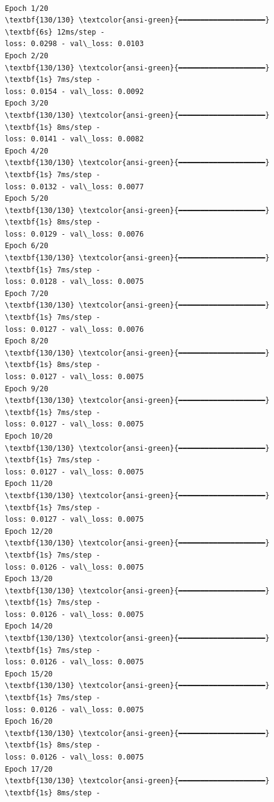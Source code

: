\documentclass[11pt]{article}
\begin{document}
    \begin{center}
    \end{center}
    { \hspace*{\fill} \\}
    
    \begin{Verbatim}[commandchars=\\\{\}]
Epoch 1/20
\textbf{130/130} \textcolor{ansi-green}{━━━━━━━━━━━━━━━━━━━━} \textbf{6s} 12ms/step -
loss: 0.0298 - val\_loss: 0.0103
Epoch 2/20
\textbf{130/130} \textcolor{ansi-green}{━━━━━━━━━━━━━━━━━━━━} \textbf{1s} 7ms/step -
loss: 0.0154 - val\_loss: 0.0092
Epoch 3/20
\textbf{130/130} \textcolor{ansi-green}{━━━━━━━━━━━━━━━━━━━━} \textbf{1s} 8ms/step -
loss: 0.0141 - val\_loss: 0.0082
Epoch 4/20
\textbf{130/130} \textcolor{ansi-green}{━━━━━━━━━━━━━━━━━━━━} \textbf{1s} 7ms/step -
loss: 0.0132 - val\_loss: 0.0077
Epoch 5/20
\textbf{130/130} \textcolor{ansi-green}{━━━━━━━━━━━━━━━━━━━━} \textbf{1s} 8ms/step -
loss: 0.0129 - val\_loss: 0.0076
Epoch 6/20
\textbf{130/130} \textcolor{ansi-green}{━━━━━━━━━━━━━━━━━━━━} \textbf{1s} 7ms/step -
loss: 0.0128 - val\_loss: 0.0075
Epoch 7/20
\textbf{130/130} \textcolor{ansi-green}{━━━━━━━━━━━━━━━━━━━━} \textbf{1s} 7ms/step -
loss: 0.0127 - val\_loss: 0.0076
Epoch 8/20
\textbf{130/130} \textcolor{ansi-green}{━━━━━━━━━━━━━━━━━━━━} \textbf{1s} 8ms/step -
loss: 0.0127 - val\_loss: 0.0075
Epoch 9/20
\textbf{130/130} \textcolor{ansi-green}{━━━━━━━━━━━━━━━━━━━━} \textbf{1s} 7ms/step -
loss: 0.0127 - val\_loss: 0.0075
Epoch 10/20
\textbf{130/130} \textcolor{ansi-green}{━━━━━━━━━━━━━━━━━━━━} \textbf{1s} 7ms/step -
loss: 0.0127 - val\_loss: 0.0075
Epoch 11/20
\textbf{130/130} \textcolor{ansi-green}{━━━━━━━━━━━━━━━━━━━━} \textbf{1s} 7ms/step -
loss: 0.0127 - val\_loss: 0.0075
Epoch 12/20
\textbf{130/130} \textcolor{ansi-green}{━━━━━━━━━━━━━━━━━━━━} \textbf{1s} 7ms/step -
loss: 0.0126 - val\_loss: 0.0075
Epoch 13/20
\textbf{130/130} \textcolor{ansi-green}{━━━━━━━━━━━━━━━━━━━━} \textbf{1s} 7ms/step -
loss: 0.0126 - val\_loss: 0.0075
Epoch 14/20
\textbf{130/130} \textcolor{ansi-green}{━━━━━━━━━━━━━━━━━━━━} \textbf{1s} 7ms/step -
loss: 0.0126 - val\_loss: 0.0075
Epoch 15/20
\textbf{130/130} \textcolor{ansi-green}{━━━━━━━━━━━━━━━━━━━━} \textbf{1s} 7ms/step -
loss: 0.0126 - val\_loss: 0.0075
Epoch 16/20
\textbf{130/130} \textcolor{ansi-green}{━━━━━━━━━━━━━━━━━━━━} \textbf{1s} 8ms/step -
loss: 0.0126 - val\_loss: 0.0075
Epoch 17/20
\textbf{130/130} \textcolor{ansi-green}{━━━━━━━━━━━━━━━━━━━━} \textbf{1s} 8ms/step -

\end{Verbatim}
\end{document}
